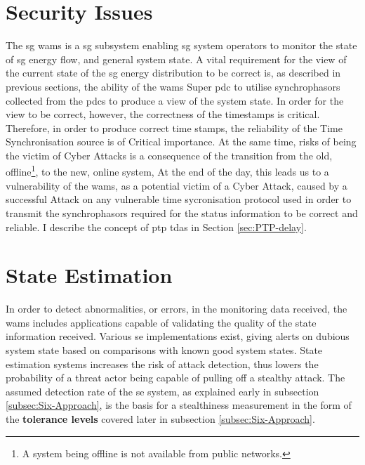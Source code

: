 \section{Security Issues}
The \acrfull{sg} \acrfull{wams} is a \acrshort{sg} subsystem enabling \acrshort{sg} system operators to monitor the state of \acrshort{sg} energy flow, and general system state. 
A vital requirement for the view of the current state of the \acrshort{sg} energy distribution to be correct is, as described in previous sections, the ability of the \acrshort{wams} Super \acrshort{pdc} to utilise synchrophasors collected from the \acrshort{pdc}s to produce a view of the system state. In order for the view to be correct, however, the correctness of the timestamps is critical. Therefore, in order to produce correct time stamps, the reliability of the Time Synchronisation source is of Critical importance. At the same time, risks of being the victim of Cyber Attacks is a consequence of the transition from the old, offline\footnote{A system being offline is not available from public networks.}, to the new, online system, At the end of the day, this leads us to a vulnerability of the \acrshort{wams}, as a potential victim of a Cyber Attack, caused by a successful Attack on any vulnerable time sycronisation protocol used in order to transmit the synchrophasors required for the status information to be correct and reliable. I describe the concept of \acrlong{ptp} \acrlong{tda}s in Section \ref{sec:PTP-delay}.


\section{State Estimation} \label{sec:3-SE}


In order to detect abnormalities, or errors, in the monitoring data received, the \acrshort{wams} includes applications capable of validating the quality of the state information received. Various \acrfull{se} implementations exist, giving alerts on dubious system state based on comparisons with known good system states. State estimation systems increases the risk of attack detection, thus lowers the probability of a threat actor being capable of pulling off a stealthy attack. The assumed detection rate of the \acrshort{se} system, as explained early in subsection \ref{subsec:Six-Approach}, is the basis for a stealthiness measurement in the form of the \textbf{tolerance levels} covered later in subsection \ref{subsec:Six-Approach}.


